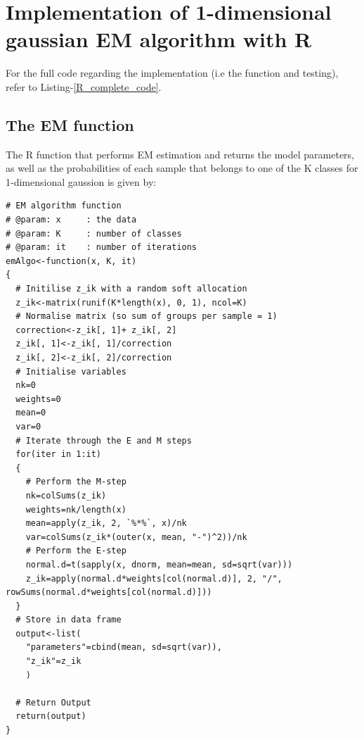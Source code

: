 \documentclass[12pt]{article}
\begin{document}
\section{Implementation of 1-dimensional gaussian EM algorithm with R}
For the full code regarding the implementation (i.e the function and testing), refer to Listing-\ref{R_complete_code}.
\subsection{The EM function}
The R function that performs EM estimation and returns the model parameters, as well as the probabilities of each sample that belongs to one of the K classes for 1-dimensional gaussion is given by:
\UseRawInputEncoding
\begin{lstlisting}[caption={EM function}]
# EM algorithm function
# @param: x     : the data
# @param: K     : number of classes
# @param: it    : number of iterations
emAlgo<-function(x, K, it)
{
  # Initilise z_ik with a random soft allocation
  z_ik<-matrix(runif(K*length(x), 0, 1), ncol=K)
  # Normalise matrix (so sum of groups per sample = 1)
  correction<-z_ik[, 1]+ z_ik[, 2]
  z_ik[, 1]<-z_ik[, 1]/correction
  z_ik[, 2]<-z_ik[, 2]/correction
  # Initialise variables
  nk=0
  weights=0
  mean=0
  var=0
  # Iterate through the E and M steps
  for(iter in 1:it)
  {
    # Perform the M-step
    nk=colSums(z_ik)
    weights=nk/length(x)
    mean=apply(z_ik, 2, `%*%`, x)/nk
    var=colSums(z_ik*(outer(x, mean, "-")^2))/nk
    # Perform the E-step
    normal.d=t(sapply(x, dnorm, mean=mean, sd=sqrt(var)))
    z_ik=apply(normal.d*weights[col(normal.d)], 2, "/", rowSums(normal.d*weights[col(normal.d)]))
  }
  # Store in data frame
  output<-list(
    "parameters"=cbind(mean, sd=sqrt(var)),
    "z_ik"=z_ik
    )

  # Return Output
  return(output)
}
\end{lstlisting}
\end{document}
